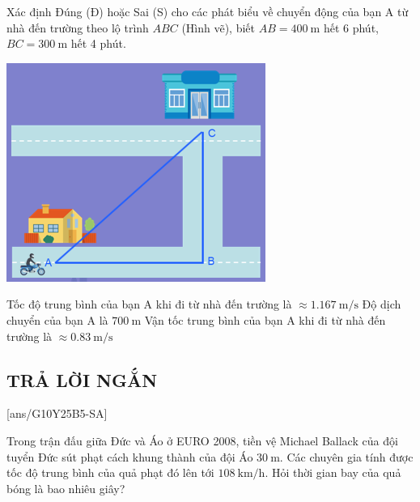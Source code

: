 \begin{ex}
	Xác định Đúng (Đ) hoặc Sai (S) cho các phát biểu về chuyển động của bạn A từ nhà đến trường theo lộ trình \(ABC\) (Hình vẽ), biết \(AB=\SI{400}{\meter}\) hết 6 phút, \(BC=\SI{300}{\meter}\) hết 4 phút.
	\begin{center}
		\includegraphics[scale=0.6]{figs/G10Y25B5-17}
	\end{center}
	{\True Tốc độ trung bình của bạn A khi đi từ nhà đến trường là \(\approx\SI{1.167}{\meter\per\second}\)}
	{Độ dịch chuyển của bạn A là \(\SI{700}{\meter}\)}
	{\True Vận tốc trung bình của bạn A khi đi từ nhà đến trường là \(\approx\SI{0.83}{\meter\per\second}\)}
\end{ex}
\subsection{TRẢ LỜI NGẮN}
\setcounter{ex}{0}
[ans/G10Y25B5-SA]
\begin{ex}
	Trong trận đấu giữa Đức và Áo ở EURO 2008, tiền vệ Michael Ballack của đội tuyển Đức sút phạt cách khung thành của đội Áo $\SI{30}{\meter}$. Các chuyên gia tính được tốc độ trung bình của quả phạt đó lên tới $\SI{108}{\kilo\meter/\hour}$. Hỏi thời gian bay của quả bóng là bao nhiêu giây?
\end{ex}


